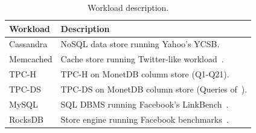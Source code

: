 \begin{table}
	\begin{center}
		\caption{Workload description.}
		\scalebox{0.7}
		\small
		\vspace{0.01in}
		\label{table:workload}
		\renewcommand{\arraystretch}{1.0}
		{\scriptsize
			\begin{tabular}{ l  l }
				\toprule
				{\bf Workload}                  & {\bf Description}  \\
				\toprule
				\multirow{1}{*}{Cassandra}                       &  NoSQL data store running Yahoo's YCSB. \\
				\cmidrule{2-2}
				\multirow{1}{*}{Memcached}                      & Cache store running Twitter-like workload~\cite{lim:thin}. \\
				\cmidrule{2-2}
				\multirow{1}{*}{TPC-H}	& TPC-H on MonetDB column store (Q1-Q21). \\
				\cmidrule{2-2}
				\multirow{1}{*}{TPC-DS}	& TPC-DS on MonetDB column store (Queries of~\cite{kocberber:meet}). \\
				\cmidrule{2-2}
				\multirow{1}{*}{MySQL} 			& SQL DBMS running Facebook's LinkBench~\cite{facebook:linkbench}. \\
				\cmidrule{2-2}
				\multirow{1}{*}{RocksDB}                             &  Store engine running Facebook benchmarks~\cite{facebook:rocksdb}. \\ %
				
				\bottomrule
			\end{tabular}
		} %
	\end{center}
	\vspace{-0.1in}
\end{table}


